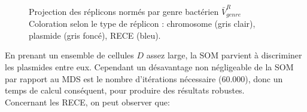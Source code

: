 \begin{figure}[H]
\begin{minipage}{0.50\textwidth}
	\label{figMDSnorm}
	\end{minipage}
	\caption[Projection des réplicons normés par genre bactérien]{Projection des réplicons normés par genre bactérien $\bar{V}^{R}_{genre}$\\\medskip Coloration selon le type de réplicon : chromosome (gris clair), plasmide (gris foncé), RECE (bleu).}
\end{figure}  

En prenant un ensemble de cellules $D$ assez large, la SOM parvient à discriminer les plasmides entre eux. Cependant un désavantage non négligeable de la SOM par rapport au MDS est le nombre d'itérations nécessaire (60.000), donc un temps de calcul conséquent, pour produire des résultats robustes.
\\
Concernant les RECE, on peut observer que:

